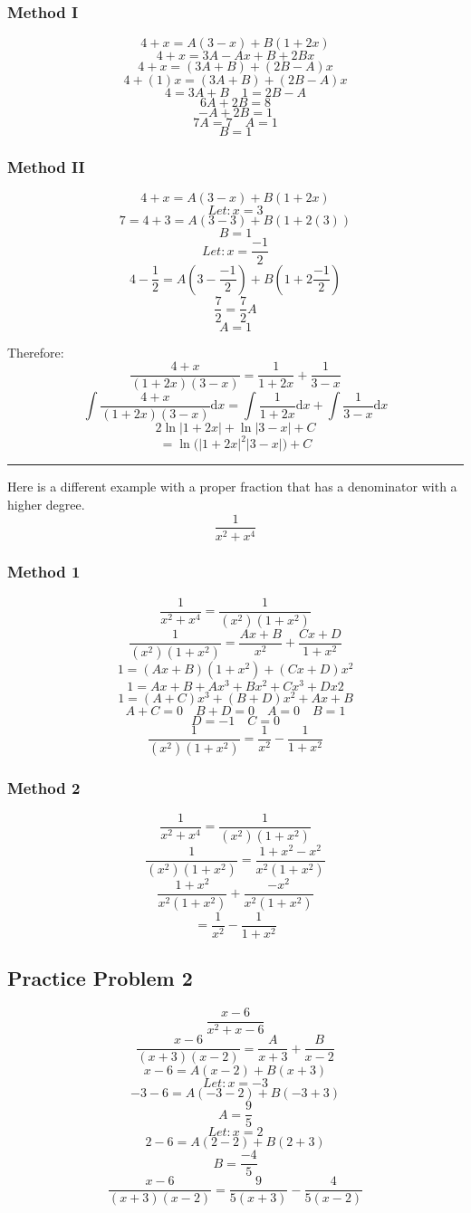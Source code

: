 \documentclass[letterpaper, 12pt]{article}
\newcommand*{\diff}{\mathrm{d}}
\begin{document}
\subsubsection*{Method I}
\[ 4+x = A(3-x)+B(1+2x) \]
\[ 4+x = 3A-Ax+B+2Bx \]
\[ 4+x = (3A+B)+(2B-A)x \]
\[ 4+(1)x = (3A+B)+(2B-A)x \]
\[ 4 = 3A+B \quad 1 = 2B-A \]
\[ 6A+2B = 8 \]
\[ -A+2B = 1 \]
\[ 7A = 7 \quad A = 1 \]
\[ B = 1 \]

\subsubsection*{Method II}
\[ 4+x = A(3-x)+B(1+2x) \]
\[ Let: x = 3 \]
\[ 7 = 4+3 = A(3-3)+B(1+2(3)) \]
\[ B = 1 \]
\[ Let: x = \frac{-1}{2} \]
\[ 4-\frac{1}{2} = A(3-\frac{-1}{2})+B(1+2\frac{-1}{2}) \]
\[ \frac{7}{2} = \frac{7}{2}A \]
\[ A = 1 \]

Therefore:
\[ \frac{4+x}{(1+2x)(3-x)} = \frac{1}{1+2x}+\frac{1}{3-x} \]
\[ \int{\frac{4+x}{(1+2x)(3-x)}\diff{x}} =
   \int{\frac{1}{1+2x}\diff{x}}+\int{\frac{1}{3-x}\diff{x}} \]
\[ 2\ln|1+2x|+\ln|3-x|+C \]
\[ = \ln\bigg(|1+2x|^{2}|3-x|\bigg)+C \]

\noindent\rule{13.7cm}{0.4pt}

Here is a different example with a proper fraction that has a denominator
with a higher degree.
\[ \frac{1}{x^{2}+x^{4}} \]

\subsubsection*{Method 1}
\[ \frac{1}{x^{2}+x^{4}} = \frac{1}{(x^{2})(1+x^{2})} \]
\[ \frac{1}{(x^{2})(1+x^{2})} = \frac{Ax+B}{x^{2}}+\frac{Cx+D}{1+x^{2}} \]
\[ 1 = (Ax+B)(1+x^{2})+(Cx+D)x^{2} \]
\[ 1 = Ax+B+Ax^{3}+Bx^{2}+Cx^{3}+Dx{2} \]
\[ 1 = (A+C)x^{3}+(B+D)x^{2}+Ax+B \]
\[ A+C = 0 \quad B+D = 0 \quad A = 0 \quad B = 1 \]
\[ D = -1 \quad C = 0 \]
\[ \frac{1}{(x^{2})(1+x^{2})} = \frac{1}{x^{2}}-\frac{1}{1+x^{2}} \]

\subsubsection*{Method 2}
\[ \frac{1}{x^{2}+x^{4}} = \frac{1}{(x^{2})(1+x^{2})} \]
\[ \frac{1}{(x^{2})(1+x^{2})} = \frac{1+x^{2}-x^{2}}{x^{2}(1+x^{2})} \]
\[ \frac{1+x^{2}}{x^{2}(1+x^{2})}+\frac{-x^{2}}{x^{2}(1+x^{2})} \]
\[ = \frac{1}{x^{2}}-\frac{1}{1+x^{2}} \]

\subsection*{Practice Problem 2}
\[ \frac{x-6}{x^{2}+x-6} \]
\[ \frac{x-6}{(x+3)(x-2)} = \frac{A}{x+3}+\frac{B}{x-2} \]
\[ x-6 = A(x-2)+B(x+3) \]
\[ Let: x = -3 \]
\[ -3-6 = A(-3-2)+B(-3+3) \]
\[ A = \frac{9}{5} \]
\[ Let: x = 2 \]
\[ 2-6 = A(2-2)+B(2+3) \]
\[ B = \frac{-4}{5} \]
\[ \frac{x-6}{(x+3)(x-2)} = \frac{9}{5(x+3)}-\frac{4}{5(x-2)} \]
\end{document}
